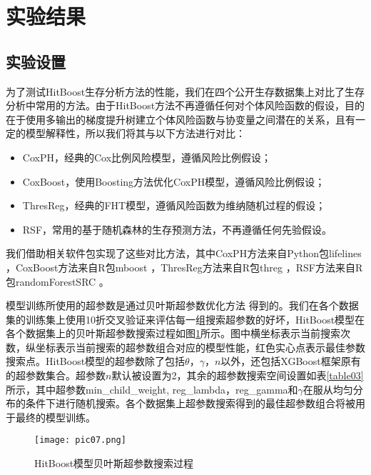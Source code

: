 \section{实验结果}

\subsection{实验设置}
为了测试HitBoost生存分析方法的性能，我们在四个公开生存数据集上对比了生存分析中常用的方法。由于HitBoost方法不再遵循任何对个体风险函数的假设，目的在于使用多输出的梯度提升树建立个体风险函数与协变量之间潜在的关系，且有一定的模型解释性，所以我们将其与以下方法进行对比：
\begin{itemize}
  \item CoxPH，经典的Cox比例风险模型，遵循风险比例假设；
  \item CoxBoost，使用Boosting方法优化CoxPH模型，遵循风险比例假设；
  \item ThresReg，经典的FHT模型，遵循风险函数为维纳随机过程的假设；
  \item RSF，常用的基于随机森林的生存预测方法，不再遵循任何先验假设。
\end{itemize}
我们借助相关软件包实现了这些对比方法，其中CoxPH方法来自Python包lifelines ，CoxBoost方法来自R包mboost ，ThresReg方法来自R包threg ，RSF方法来自R包randomForestSRC 。

模型训练所使用的超参数是通过贝叶斯超参数优化方法 得到的。我们在各个数据集的训练集上使用10折交叉验证来评估每一组搜索超参数的好坏，HitBoost模型在各个数据集上的贝叶斯超参数搜索过程如图\ref{pic07}所示。图中横坐标表示当前搜索次数，纵坐标表示当前搜索的超参数组合对应的模型性能，红色实心点表示最佳参数搜索点。HitBoost模型的超参数除了包括$\theta$，$\gamma$，$n$以外，还包括XGBoost框架原有的超参数集合。超参数$n$默认被设置为2，其余的超参数搜索空间设置如表\ref{table03}所示，其中超参数min\_child\_weight, reg\_lambda，reg\_gamma和$\gamma$在服从均匀分布的条件下进行随机搜索。各个数据集上超参数搜索得到的最佳超参数组合将被用于最终的模型训练。

\begin{figure}[H]
\texttt{[image: pic07.png]}
\caption{HitBoost模型贝叶斯超参数搜索过程}
\label{pic07}
\end{figure}

